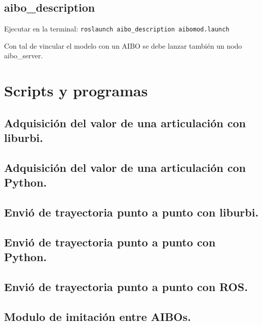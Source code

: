 \documentclass[12pt,a4paper,final,twoside]{article}
\begin{document}
\subsection{aibo{\_}description}
Ejecutar en la terminal:
\texttt{roslaunch aibo{\_}description aibomod.launch}

Con tal de vincular el modelo con un AIBO se debe lanzar también un nodo aibo{\_}server.

\newpage

\section{Scripts y programas}
\subsection{Adquisición del valor de una articulación con liburbi.}
\label{getDataOneLegC++}


\subsection{Adquisición del valor de una articulación con Python.}
\label{getDataOneLegPy}


\subsection{Envió de trayectoria punto a punto con liburbi.}\label{sinC}


\subsection{Envió de trayectoria punto a punto con Python.}\label{sinP}


\subsection{Envió de trayectoria punto a punto con ROS.}\label{sinlegROS}


\subsection{Modulo de imitación entre AIBOs.}\label{mimiccode}

\end{document}
